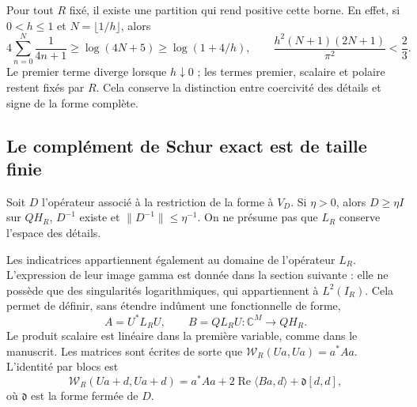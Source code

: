 Pour tout \(R\) fixé, il existe une partition qui rend positive cette
borne. En effet, si \(0<h\leq1\) et \(N=\lfloor1/h\rfloor\), alors
\[
4\sum_{n=0}^N\frac1{4n+1}\geq\log(4N+5)\geq\log(1+4/h),
\qquad
\frac{h^2(N+1)(2N+1)}{\pi^2}<\frac23.
\]
Le premier terme diverge lorsque \(h\downarrow0\) ; les termes
premier, scalaire et polaire restent fixés par \(R\). Cela conserve
la distinction entre coercivité des détails et signe de la
forme complète.

\subsection{Le complément de Schur exact est de taille finie}
\label{viii:schur-add-sub-97}

Soit \(D\) l'opérateur associé à la restriction de la forme à \(V_D\).
Si \(\eta>0\), alors \(D\geq\eta I\) sur \(QH_R\),
\(D^{-1}\) existe et \(\|D^{-1}\|\leq\eta^{-1}\).
On ne présume pas que \(L_R\) conserve l'espace des détails.

Les indicatrices appartiennent également au domaine de l'opérateur \(L_R\). L'expression de leur image gamma est donnée dans la section suivante : elle ne possède que des singularités logarithmiques, qui appartiennent à \(L^2(I_R)\). Cela permet de définir, sans étendre indûment une fonctionnelle de forme,
\begin{equation}
A=U^*L_RU,\qquad B=QL_RU:\mathbb C^M\longrightarrow QH_R.
\label{viii:schur-add-display-6}
\end{equation}
Le produit scalaire est linéaire dans la première variable, comme dans le
manuscrit. Les matrices sont écrites de sorte que
\(\mathscr W_R(Ua,Ua)=a^*Aa\). L'identité par blocs est
\begin{equation}
\mathscr W_R(Ua+d,Ua+d)
=a^*Aa+2\operatorname{Re}\langle Ba,d\rangle
+\mathfrak d[d,d],
\label{viii:schur-add-display-7}
\end{equation}
où \(\mathfrak d\) est la forme fermée de \(D\).


